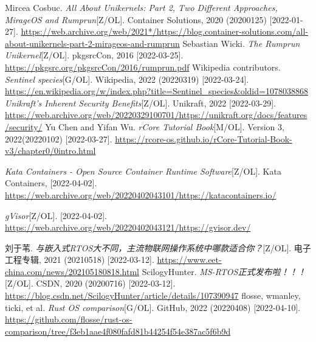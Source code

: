 \documentclass[UTF8,fontset=none,linespread=1.15]{ctexart}
\begin{document}
\begin{thebibliography}{99}
 Mircea Cosbuc. \textit{All About Unikernels: Part 2, Two Different Approaches, MirageOS and Rumprun}[Z/OL]. Container Solutions, 2020 (20200125) [2022-01-27]. \url{https://web.archive.org/web/2021*/https://blog.container-solutions.com/all-about-unikernels-part-2-mirageos-and-rumprun}
 Sebastian Wicki. \textit{The Rumprun Unikernel}[Z/OL]. pkgsrcCon, 2016
[2022-03-25]. \url{https://pkgsrc.org/pkgsrcCon/2016/rumprun.pdf}
 Wikipedia contributors. \textit{Sentinel species}[G/OL]. Wikipedia, 2022 (20220319) [2022-03-24]. \url{https://en.wikipedia.org/w/index.php?title=Sentinel_species&oldid=1078038868}
 \textit{Unikraft's Inherent Security Benefits}[Z/OL]. Unikraft, 2022 [2022-03-29]. \url{https://web.archive.org/web/20220329100701/https://unikraft.org/docs/features/security/}
 Yu Chen and Yifan Wu. \textit{rCore Tutorial Book}[M/OL]. Version 3,
2022(20220102) [2022-03-27]. \url{https://rcore-os.github.io/rCore-Tutorial-Book-v3/chapter0/0intro.html}

 \textit{Kata Containers - Open Source Container Runtime Software}[Z/OL].
Kata Containers, [2022-04-02]. \url{https://web.archive.org/web/20220402043101/https://katacontainers.io/}

 \textit{gVisor}[Z/OL]. [2022-04-02]. \url{https://web.archive.org/web/20220402043121/https://gvisor.dev/}

 刘于苇. \textit{与嵌入式RTOS大不同，主流物联网操作系统中哪款适合你？}[Z/OL].
电子工程专辑, 2021 (20210518) [2022-03-12]. \url{https://www.eet-china.com/news/202105180818.html}
 ScilogyHunter. \textit{MS-RTOS正式发布啦！！！}[Z/OL]. CSDN, 2020 (20200716) [2022-03-12]. \url{https://blog.csdn.net/ScilogyHunter/article/details/107390947}
 flosse, wmanley, ticki, et al. \textit{Rust OS comparison}[G/OL]. GitHub, 2022 (20220408) [2022-04-10]. \url{https://github.com/flosse/rust-os-comparison/tree/f3eb1aae4f080fafd81b44254f54e387ac5f6b9d}
\end{thebibliography}
\end{document}
